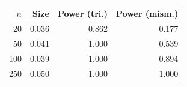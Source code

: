 \begin{tabular}{rrrr}
\toprule
$n$ & Size & Power (tri.) & Power (mism.) \\
\midrule
20 & 0.036 & 0.862 & 0.177 \\
50 & 0.041 & 1.000 & 0.539 \\
100 & 0.039 & 1.000 & 0.894 \\
250 & 0.050 & 1.000 & 1.000 \\
\bottomrule
\end{tabular}

